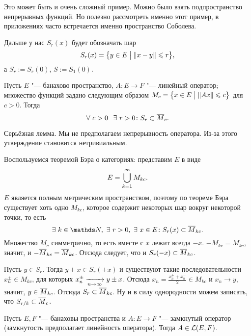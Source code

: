 Это может быть и очень сложный пример. Можно было взять подпространство непрерывных функций. Но полезно рассмотреть именно этот пример, в приложениях часто встречается именно пространство Соболева.

Дальше у нас $S_r(x)$ будет обозначать шар
\[
  S_r(x) = \big\{y\in E\bigm| \|x-y\|\le r\big\},
\]
а $S_r:=S_r(0)$, $S:=S_1(0)$.

\begin{Lem}
 Пусть $E$ "--- банахово пространство, $A\colon E\to F$ "--- линейный оператор; множество функций задано следующим образом $M_c = \big\{x\in E\bigm|\|Ax\|\le c\big\}$ для $c>0$. Тогда
\[
  \forall\ c>0\pau \exists\ r>0\colon S_r\subset \ol M_c.
\]
\end{Lem}
Серьёзная лемма. Мы не предполагаем непрерывность оператора. Из-за этого утверждение становится нетривиальным.
\begin{Proof}
  Воспользуемся теоремой Бэра о категориях: представим $E$ в виде
\[
  E = \uN k1 M_{kc}.
\]
$E$ является полным метрическим пространством, поэтому по теореме Бэра существует хоть одно $M_{kc}$, которое содержит некоторых шар вокруг некоторой точки, то есть
\[
  \exists\ k\in\N,\ \exists\ r>0,\ \exists\ x\in E\colon S_r(x)\subset \ol M_{kc}.
\]
Множество $M_c$ симметрично, то есть вместе с $x$ лежит всегда $-x$. $-M_{kc}=M_{kc}$, значит, и $-\ol M_{kc} = \ol M_{kc}$. Отсюда следует, что и $S_r(-x)\subset \ol M_{kc}$.

Пусть $y\in S_r$. Тогда $y\pm x\in S_r(\pm x)$ и существуют такие последовательности $x_n^\pm\in M_{kc}$, для которых $x_n^\pm\te y\pm x$. Отсюда $x_n = \frac{x_n^+ + x_n^-}{2}\in M_{kc}$ и $x_n\to y$, значит, $y\in \ol M_{kc}$. Отсюда $S_r\subset \ol M_{kc}$. Ну и в силу однородности можем записать, что $S_{r/k}\subset \ol M_c$.
\end{Proof}
\begin{The}\label{zamgr}
  Пусть $E,F$ "--- банаховы пространства и $A\colon E\to F$ "--- замкнутый оператор (замкнутость предполагает линейность оператора). Тогда $A\in\L(E,F)$. 
\end{The}
